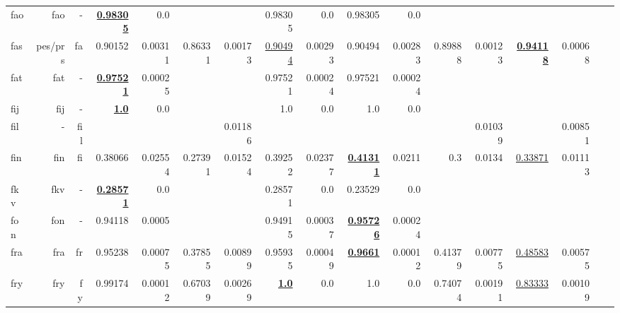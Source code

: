 \documentclass[11pt]{article}
\begin{document}
\begin{table*}[h]
{\begin{tabular}{lrrrrrrrrrrrrrrrr}
fao         & fao         & -         & \textbf{\underline{0.98305}}         & 0.0         &          &          & 0.98305         & 0.0         & 0.98305         & 0.0         &          &          &          &          \\
fas         & pes/prs         & fa         & 0.90152         & 0.00311         & 0.86331         & 0.00173         & \underline{0.90494}         & 0.00293         & 0.90494         & 0.00283         & 0.89888         & 0.00123         & \textbf{\underline{0.94118}}         & 0.00068         \\
fat         & fat         & -         & \textbf{\underline{0.97521}}         & 0.00025         &          &          & 0.97521         & 0.00024         & 0.97521         & 0.00024         &          &          &          &          \\
fij         & fij         & -         & \textbf{\underline{1.0}}         & 0.0         &          &          & 1.0         & 0.0         & 1.0         & 0.0         &          &          &          &          \\
fil         & -         & fil         &          &          &          & 0.01186         &          &          &          &          &          & 0.01039         &          & 0.00851         \\
fin         & fin         & fi         & 0.38066         & 0.02554         & 0.27391         & 0.01524         & 0.39252         & 0.02377         & \textbf{\underline{0.41311}}         & 0.0211         & 0.3         & 0.0134         & \underline{0.33871}         & 0.01113         \\
fkv         & fkv         & -         & \textbf{\underline{0.28571}}         & 0.0         &          &          & 0.28571         & 0.0         & 0.23529         & 0.0         &          &          &          &          \\
fon         & fon         & -         & 0.94118         & 0.0005         &          &          & 0.94915         & 0.00037         & \textbf{\underline{0.95726}}         & 0.00024         &          &          &          &          \\
fra         & fra         & fr         & 0.95238         & 0.00075         & 0.37855         & 0.00899         & 0.95935         & 0.00049         & \textbf{\underline{0.9661}}         & 0.00012         & 0.41379         & 0.00775         & \underline{0.48583}         & 0.00575         \\
fry         & fry         & fy         & 0.99174         & 0.00012         & 0.67039         & 0.00269         & \textbf{\underline{1.0}}         & 0.0         & 1.0         & 0.0         & 0.74074         & 0.00191         & \underline{0.83333}         & 0.00109         \\

\end{tabular}}
\end{table*}
\end{document}
